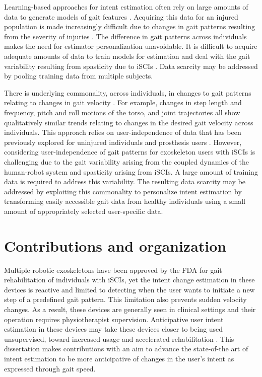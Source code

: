 Learning-based approaches for intent estimation often rely on large amounts of data to generate models of gait features \cite{lee2020image,moolchandani2021design}. Acquiring this data for an injured population is made increasingly difficult due to changes in gait patterns resulting from the severity of injuries \cite{sohn2018variability}. The difference in gait patterns across individuals makes the need for estimator personalization unavoidable. It is difficult to acquire adequate amounts of data to train models for estimation and deal with the gait variability resulting from spasticity due to iSCIs \cite{krawetz1996gait}. Data scarcity may be addressed by pooling training data from multiple subjects.

There is underlying commonality, across individuals, in changes to gait patterns relating to changes in gait velocity \cite{li1999coordination}. For example, changes in step length and frequency, pitch and roll motions of the torso, and joint trajectories all show qualitatively similar trends relating to changes in the desired gait velocity across individuals. This approach relies on user-independence of data that has been previously explored for uninjured individuals \cite{ibrahim2008gait, kilmartin2009optimising, wang2008accelerometry} and prosthesis users \cite{young2015classification}. However, considering user-independence of gait patterns for exoskeleton users with iSCIs is challenging due to the gait variability arising from the coupled dynamics of the human-robot system and spasticity arising from \mbox{iSCIs}. A large amount of training data is required to address this variability. The resulting data scarcity may be addressed by exploiting this commonality to personalize intent estimation by transforming easily accessible gait data from healthy individuals using a small amount of appropriately selected user-specific data.

\section{Contributions and organization}\label{sec:contribution}

Multiple robotic exoskeletons have been approved by the FDA for gait rehabilitation of individuals with iSCIs, yet the intent change estimation in these devices is reactive and limited to detecting when the user wants to initiate a new step of a predefined gait pattern. This limitation also prevents sudden velocity changes. As a result, these devices are generally seen in clinical settings and their operation requires physiotherapist supervision. Anticipative user intent estimation in these devices may take these devices closer to being used unsupervised, toward increased usage and accelerated rehabilitation \cite{hidler2011role}. This dissertation makes contributions with an aim to advance the state-of-the art of intent estimation to be more anticipative of changes in the user's intent as expressed through gait speed.

